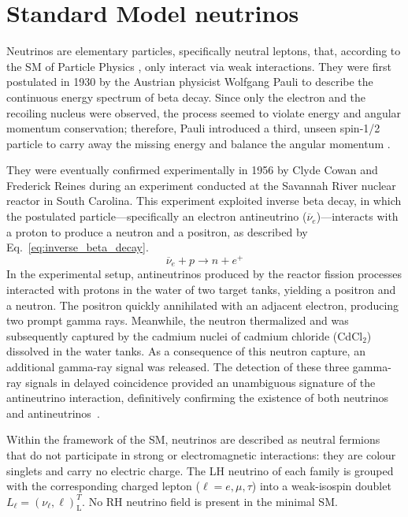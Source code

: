 \chapter{Standard Model neutrinos}
\label{chapter:nuIntro}
Neutrinos are elementary particles, specifically neutral leptons, that, according to the \ac{SM} of Particle Physics \cite{fundamentalsOFnu}, only interact via weak interactions.  
They were first postulated in 1930 by the Austrian physicist Wolfgang Pauli to describe the continuous energy spectrum of beta decay. 
Since only the electron and the recoiling nucleus were observed, the process seemed to violate energy and angular momentum conservation; therefore, Pauli introduced a third, 
unseen spin-1/2 particle to carry away the missing energy and balance the angular momentum \cite{Pauli:1930neutrinos}.

They were eventually confirmed experimentally in 1956 by Clyde Cowan and Frederick Reines during an experiment conducted at the Savannah River 
nuclear reactor in South Carolina. 
This experiment exploited inverse beta decay, in which the postulated particle---specifically an electron antineutrino ($\overline{\nu}_e$)---interacts with a proton to produce a neutron and a positron, as described by Eq.~\ref{eq:inverse_beta_decay}.
\begin{equation}
    \label{eq:inverse_beta_decay}
    \overline{\nu}_e + p \rightarrow n + e^{+}
\end{equation}
In the experimental setup, antineutrinos produced by the reactor fission processes interacted with protons in the water of two target tanks, 
yielding a positron and a neutron. The positron quickly annihilated with an adjacent electron, producing two prompt gamma rays. 
Meanwhile, the neutron thermalized and was subsequently captured by the cadmium nuclei of cadmium chloride (CdCl$_2$) dissolved in the water tanks.
As a consequence of this neutron capture, an additional gamma-ray signal was released. The detection of these three gamma-ray signals 
in delayed coincidence provided an unambiguous signature of the antineutrino interaction, definitively confirming the existence of 
both neutrinos and antineutrinos~\cite{cowan1956nudetection}.

Within the framework of the \ac{SM}, neutrinos are described as neutral fermions that do not participate in strong or 
electromagnetic interactions: they are colour singlets and carry no electric charge. The \ac{LH} neutrino of each family is grouped with the corresponding charged lepton ($\ell = e, \mu, \tau$) into a weak-isospin doublet $L_\ell = (\nu_\ell, \ell)^T_\text{L}$.
No \ac{RH} neutrino field is present in the minimal \ac{SM}.

